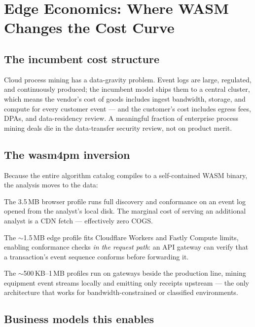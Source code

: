 \chapter{Edge Economics: Where WASM Changes the Cost Curve}
\label{ch:edge}

\section{The incumbent cost structure}

Cloud process mining has a data-gravity problem. Event logs are large,
regulated, and continuously produced; the incumbent model ships them to a
central cluster, which means the vendor's cost of goods includes ingest
bandwidth, storage, and compute for every customer event --- and the
customer's cost includes egress fees, DPAs, and data-residency review.
A meaningful fraction of enterprise process mining deals die in the
data-transfer security review, not on product merit.

\section{The wasm4pm inversion}

Because the entire algorithm catalog compiles to a self-contained WASM
binary, the analysis moves to the data:

\begin{description}[leftmargin=2em]
  \item[Browser.] The 3.5\,MB browser profile runs full discovery and
    conformance on an event log opened from the analyst's local disk. The
    marginal cost of serving an additional analyst is a CDN fetch ---
    effectively zero COGS.
  \item[Edge runtimes.] The $\sim$1.5\,MB edge profile fits Cloudflare
    Workers and Fastly Compute limits, enabling conformance checks
    \emph{in the request path}: an API gateway can verify that a
    transaction's event sequence conforms before forwarding it.
  \item[IoT / shop floor.] The $\sim$500\,KB--1\,MB profiles run on
    gateways beside the production line, mining equipment event streams
    locally and emitting only receipts upstream --- the only architecture
    that works for bandwidth-constrained or classified environments.
\end{description}

\section{Business models this enables}

